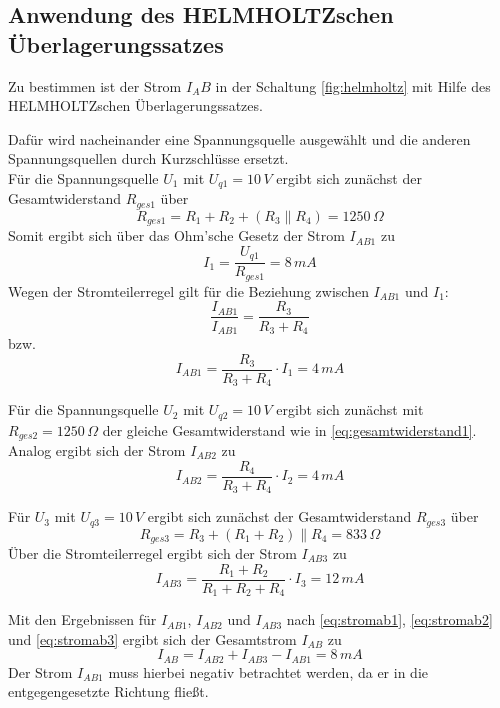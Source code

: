 \subsection{Anwendung des HELMHOLTZschen Überlagerungssatzes}\label{sec:helmholtz}

Zu bestimmen ist der Strom $I_AB$ in der Schaltung \ref{fig:helmholtz} mit Hilfe des HELMHOLTZschen Überlagerungssatzes.

Dafür wird nacheinander eine Spannungsquelle ausgewählt und die anderen Spannungsquellen durch Kurzschlüsse ersetzt.\\
Für die Spannungsquelle $U_1$ mit $U_{q1}=10\,V$ ergibt sich zunächst der Gesamtwiderstand $R_{ges1}$ über
\begin{equation}
    \label{eq:gesamtwiderstand1}
    R_{ges1}=R_1+R_2+(R_3\parallel R_4)=1250\,\Omega
\end{equation}
Somit ergibt sich über das Ohm'sche Gesetz der Strom $I_{AB1}$ zu
\begin{equation*}
    I_{1}=\frac{U_{q1}}{R_{ges1}}=8\,mA
\end{equation*}
Wegen der Stromteilerregel gilt für die Beziehung zwischen $I_{AB1}$ und $I_{1}$:
\begin{equation*}
    \frac{I_{AB1}}{I_{AB1}}=\frac{R_3}{R_3+R_4}
\end{equation*}
bzw.
\begin{equation}
    \label{eq:stromab1}
    I_{AB1}=\frac{R_3}{R_3+R_4}\cdot{I_{1}}=4\,mA
\end{equation}

Für die Spannungsquelle $U_2$ mit $U_{q2}=10\,V$ ergibt sich zunächst mit $R_{ges2} = 1250\,\Omega$ der gleiche Gesamtwiderstand wie in \eqref{eq:gesamtwiderstand1}. Analog ergibt sich der Strom $I_{AB2}$ zu
\begin{equation}
    \label{eq:stromab2}
    I_{AB2}=\frac{R_4}{R_3+R_4}\cdot{I_{2}}=4\,mA
\end{equation}

Für $U_3$ mit $U_{q3}=10\,V$ ergibt sich zunächst der Gesamtwiderstand $R_{ges3}$ über
\begin{equation*}
    R_{ges3}=R_3+(R_1+R_2)\parallel R_4=833\,\Omega
\end{equation*}
Über die Stromteilerregel ergibt sich der Strom $I_{AB3}$ zu
\begin{equation}
    \label{eq:stromab3}
    I_{AB3}=\frac{R_1 + R_2}{R_1+R_2+R_4}\cdot{I_{3}}=12\,mA
\end{equation}

Mit den Ergebnissen für $I_{AB1}$, $I_{AB2}$ und $I_{AB3}$ nach \eqref{eq:stromab1}, \eqref{eq:stromab2} und \eqref{eq:stromab3}  ergibt sich der Gesamtstrom $I_{AB}$ zu
\begin{equation*}
    I_{AB}=I_{AB2}+I_{AB3}-I_{AB1}=8\,mA
\end{equation*}
Der Strom $I_{AB1}$ muss hierbei negativ betrachtet werden, da er in die entgegengesetzte Richtung fließt.



